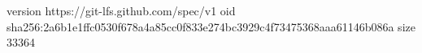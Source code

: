 version https://git-lfs.github.com/spec/v1
oid sha256:2a6b1e1ffc0530f678a4a85cc0f833e274bc3929c4f73475368aaa61146b086a
size 33364

